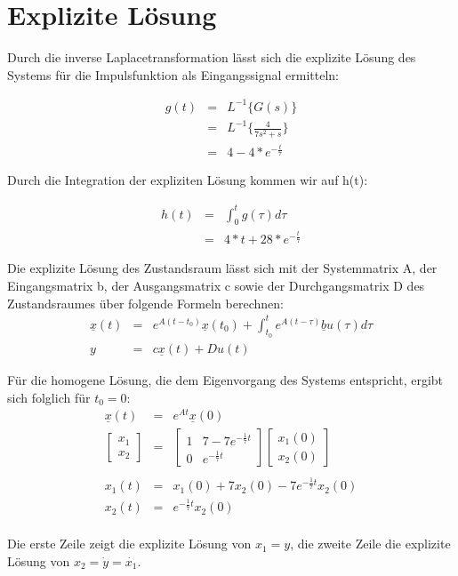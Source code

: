 \section{Explizite Lösung}

Durch die inverse Laplacetransformation lässt sich die explizite Lösung des Systems für die Impulsfunktion als Eingangssignal ermitteln:

\begin{eqnarray*}
	g(t) &=& L^{-1}\{G(s)\}  \\ 
	&=& L^{-1}\{\frac{4}{7s^2 + s}\}\\
	&=& 4 - 4*e^{-\frac{t}{7}}
\end{eqnarray*}

\noindent
Durch die Integration der expliziten Lösung kommen wir auf h(t):

\begin{eqnarray*}
	h(t) &=& \int_{0}^{t}g(\tau)d\tau \\ 
	&=& 4 * t + 28*e^{-\frac{t}{7}}
\end{eqnarray*}

\noindent
Die explizite Lösung des Zustandsraum lässt sich mit der Systemmatrix A, der Eingangsmatrix b, der Ausgangsmatrix c sowie der Durchgangsmatrix D des Zustandsraumes über folgende Formeln berechnen:
\begin{eqnarray*}
 \underline{x}(t) &=& e^{A(t-t_{0})} \underline{x}(t_0) + \int_{t_0}^{t}e^{A(t-\tau)}  \underline{b}u(\tau) d\tau \\
 y &=& c\underline{x}(t) + Du(t)
\end{eqnarray*}

\noindent
Für die homogene Lösung, die dem Eigenvorgang des Systems entspricht, ergibt sich folglich für \(t_0=0\): 
\begin{eqnarray*}
\underline{x}(t) &=& e^{At} \underline{x}(0) \\
 \left[\begin{array}{c} x_1 \\ x_2 \end{array}\right]&=& \left[\begin{array}{cc} 1 & 7 - 7e^{-\frac{1}{7}t} \\ 0 & e^{-\frac{1}{7}t} \end{array}\right]  \left[\begin{array}{c}x_1(0) \\ x_2(0)\end{array}\right] \\ \\
 x_1(t) &=& x_1(0) + 7x_2(0) - 7e^{-\frac{1}{7}t}x_2(0) \\ 
 x_2(t) &=& e^{-\frac{1}{7}t}x_2(0) \\
\end{eqnarray*}


\noindent
Die erste Zeile zeigt die explizite Lösung von \(x_1 = y\), die zweite Zeile die explizite Lösung von \(x_2 = \dot{y} = \dot{x_1}\).
